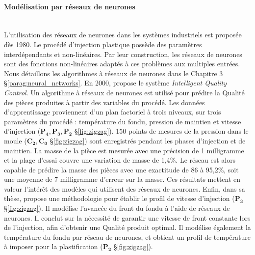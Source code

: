 \paragraph{Modélisation par réseaux de neurones}\mbox{} \\
L'utilisation des réseaux de neurones dans les systèmes industriels est proposée dès 1980.
Le procédé d'injection plastique possède des paramètres interdépendants et non-linéaires.
Par leur construction, les réseaux de neurones sont des fonctions non-linéaires adaptés à ces problèmes aux multiples entrées.
Nous détaillons les algorithmes à réseaux de neurones dans le Chapitre 3 §\ref{parag:neural_networks}.
En 2000, \cite{schnerr-haselbarth_automation_2000} propose le système \textit{Intelligent Quality Control}.
Un algorithme à réseaux de neurones est utilisé pour prédire la Qualité des pièces produites à partir des variables du procédé.
Les données d’apprentissage proviennent d’un plan factoriel à trois niveaux, sur trois paramètres du procédé : température du fondu, pression de maintien et vitesse d’injection ($\boldsymbol{P_4, P_3, P_2}$ §\ref{fig:zigzag}).
150 points de mesures de la pression dans le moule ($\boldsymbol{C_2, C_0}$ §\ref{fig:zigzag}) sont enregistrés pendant les phases d’injection et de maintien.
La masse de la pièce est mesurée avec une précision de 1 milligramme et la plage d’essai couvre une variation de masse de 1,4\%.
Le réseau est alors capable de prédire la masse des pièces avec une exactitude de 86 à 95,2\%, soit une moyenne de 7 milligramme d’erreur sur la masse.
Ces résultats mettent en valeur l'intérêt des modèles qui utilisent des réseaux de neurones.
Enfin, dans sa thèse, \cite{chen_characteristics_2002} propose une méthodologie pour établir le profil de vitesse d’injection ($\boldsymbol{P_3}$ §\ref{fig:zigzag}).
Il modélise l’avancée du front du fondu à l'aide de réseaux de neurones.
Il conclut sur la nécessité de garantir une vitesse de front constante lors de l'injection, afin d’obtenir une Qualité produit optimal.
Il modélise également la température du fondu par réseau de neurones, et obtient un profil de température à imposer pour la plastification ($\boldsymbol{P_2}$ §\ref{fig:zigzag}).

